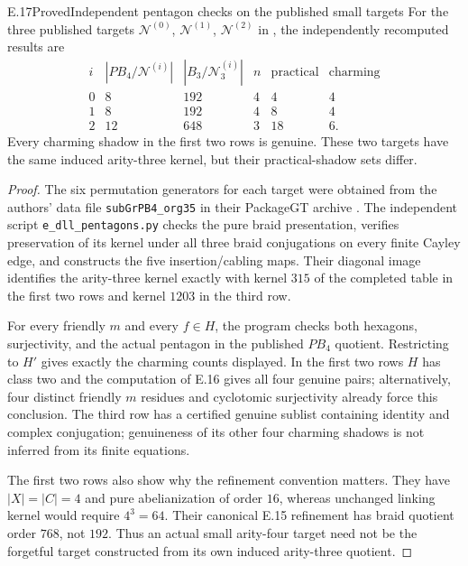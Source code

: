 \begin{statement}{E.17}{Proved}{Independent pentagon checks on the published small targets}
For the three published targets $\mathcal N^{(0)}$,
$\mathcal N^{(1)}$, $\mathcal N^{(2)}$ in
\citet[Table~1]{DolgushevLeLorenz2024}, the independently
recomputed results are
\[
\begin{array}{c|r|r|r|r|r}
 i&|PB_4/\mathcal N^{(i)}|&|B_3/\mathcal N^{(i)}_3|&
 n&\text{practical}&\text{charming}\\\hline
0&8&192&4&4&4\\1&8&192&4&8&4\\2&12&648&3&18&6.
\end{array}
\]
Every charming shadow in the first two rows is genuine.
These two targets have the same induced arity-three kernel,
but their practical-shadow sets differ.
\end{statement}
\begin{proof}
The six permutation generators for each target were obtained
from the authors' data file \texttt{subGrPB4\_org35} in their
PackageGT archive \citep{Dolgushev2022PackageGT}.
The independent script \texttt{e\_dll\_pentagons.py} checks the
pure braid presentation, verifies preservation of its kernel
under all three braid conjugations on every finite Cayley edge,
and constructs the five insertion/cabling maps. Their diagonal
image identifies the arity-three kernel exactly with kernel
$315$ of the completed table in the first two rows and kernel
$1203$ in the third row.

For every friendly $m$ and every $f\in H$, the program checks
both hexagons, surjectivity, and the actual pentagon in the
published $PB_4$ quotient. Restricting to $H'$ gives exactly
the charming counts displayed. In the first two rows $H$ has
class two and the computation of E.16 gives all four genuine
pairs; alternatively, four distinct friendly $m$ residues and
cyclotomic surjectivity already force this conclusion.
The third row has a certified genuine sublist containing
identity and complex conjugation; genuineness of its other
four charming shadows is not inferred from its finite equations.

The first two rows also show why the refinement convention
matters. They have $|X|=|C|=4$ and pure abelianization of order
$16$, whereas unchanged linking kernel would require $4^3=64$.
Their canonical E.15 refinement has braid quotient order $768$,
not $192$. Thus an actual small arity-four target need not be
the forgetful target constructed from its own induced
arity-three quotient.
\end{proof}
